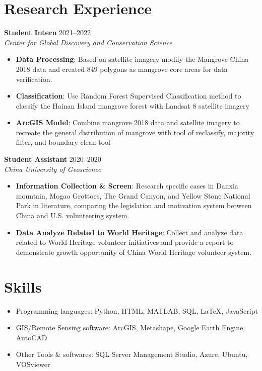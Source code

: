 \documentclass[11pt,a4paper]{article}
\newcommand{\Rexp}[3]{\noindent\textbf{#1} \hfill #2\\ \textit{#3} \vspace{-9 pt}\\}
\newcommand{\resumeItem}[2]{
  \item\small{
    \textbf{#1}{: #2 \vspace{-6pt}}
  }
}
\newcommand{\resumeItemListStart}{\begin{itemize}}
\newcommand{\resumeItemListEnd}{\end{itemize}\vspace{-5pt}}
\begin{document}
\section{Research Experience}
\Rexp{Student Intern}{2021--2022}{Center for Global Discovery and Conservation Science}
    \resumeItemListStart
        \resumeItem{Data Processing}{Based on satellite imagery modify the Mangrove China 2018 data and created 849 polygons as
        mangrove core areas for data verification.}
        \resumeItem{Classification}{Use Random Forest Supervised Classification method to classify the Hainan Island mangrove forest
        with Landsat 8 satellite imagery}
        \resumeItem{ArcGIS Model}{Combine mangrove 2018 data and satellite imagery to recreate the general distribution of
        mangrove with tool of reclassify, majority filter, and boundary clean tool}
    \resumeItemListEnd
\vspace{7pt}
\Rexp{Student Assistant}{2020--2020}{China University of Geoscience}
    \resumeItemListStart
        \resumeItem{Information Collection \& Screen}{Research specific cases in Danxia mountain, Mogao Grottoes, The Grand Canyon, and Yellow Stone National Park in literature, comparing the legislation and motivation system between China and U.S. volunteering system.}
        \resumeItem{Data Analyze Related to World Heritage}{Collect and analyze data related to World Heritage volunteer initiatives and provide a report to demonstrate growth opportunity of China World Heritage volunteer system.}
    \resumeItemListEnd
\vspace{7pt}
\section{Skills}
\begin{itemize}
    \item Programming languages: Python, HTML, MATLAB, SQL, LaTeX, JavaScript
    \item GIS/Remote Sensing software: ArcGIS, Metashape, Google Earth Engine, AutoCAD
    \item Other Tools \& softwares: SQL Server Management Studio, Azure, Ubuntu, VOSviewer
\end{itemize}

\end{document}
